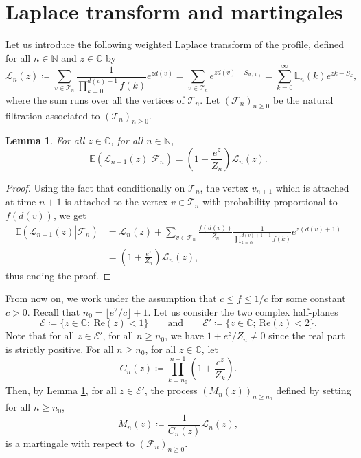 \documentclass[11pt]{article}
\newtheorem{lemma}[theorem]{Lemma}
\numberwithin{equation}{section}
\def \N{\mathbb{N}}
\def \C{\mathbb{C}}
\def \T{\mathcal{T}}
\def \cL{\mathcal{L}}
\def\E{\mathbb{E}}
\renewcommand{\Re}{\mathrm{Re}}
\begin{document}
\section{Laplace transform and martingales}\label{section martingale}
Let us introduce the following weighted Laplace transform of the profile, defined for all $n\in \N$ and $z \in \C$ by
\[
\cL_n(z) \coloneqq \sum_{v \in \T_n} \frac{1}{\prod_{k=0}^{d(v)-1} f(k)} e^{zd(v)}  = \sum_{v \in \T_n} e^{zd(v)-S_{d(v)}} = \sum_{k=0}^{\infty} \mathbb{L}_n(k)e^{zk-S_k},
\]
where the sum runs over all the vertices of $\T_n$. Let $(\mathcal{F}_n)_{n\ge 0}$ be the natural filtration associated to $(\T_n)_{n\ge 0}$.
\begin{lemma}\label{lemme martingale}
	For all $z \in \C$, for all $n \in \N$,
	\[
	\E\left(\left. \cL_{n+1}(z)\right\vert \mathcal{F}_n \right) = \left(1 + \frac{e^z}{Z_n}\right) \cL_n(z).
	\]
\end{lemma}
\begin{proof}
	Using the fact that conditionally on $\T_n$, the vertex $v_{n+1}$ which is attached at time $n+1$ is attached to the vertex $v \in \T_n$ with probability proportional to $f(d(v))$, we get
	\begin{align*}
		\E\left(\left. \cL_{n+1}(z)\right\vert \mathcal{F}_n \right)&=
		\cL_n(z) + \sum_{v \in \T_n} \frac{f(d(v))}{Z_n} \frac{1}{\prod_{k=0}^{d(v)+1-1} f(k)} e^{z (d(v)+1)}
		\\
		&=
		\left(1+ \frac{e^z}{Z_n} \right) \cL_n(z),
	\end{align*}
	thus ending the proof.
\end{proof}
From now on, we work under the assumption that $c\le f\le 1/c$ for some constant $c>0$. Recall that $n_0= \lfloor e^2/c \rfloor +1$. Let us consider the two complex half-planes
\[
\mathcal{E} \coloneqq \{ z \in \C; \ \Re(z) <1\} \qquad \text{and} \qquad
\mathcal{E}' \coloneqq \{ z\in \C; \ \Re(z) < 2\}.
\]
Note that for all $z \in \mathcal{E}'$, for all $n\ge n_0$, we have $1+ e^z/Z_n \neq 0$ since the real part is strictly positive. For all $n\ge n_0$, for all $z\in \C$, let
\[
C_n(z) \coloneqq  \prod_{k=n_0}^{n-1} \left( 1 + \frac{e^z}{Z_k}\right).
\]
Then, by Lemma \ref{lemme martingale}, for all $z\in \mathcal{E}'$, the process $(M_n(z))_{n\ge n_0}$ defined by setting for all $n\ge n_0$,
\[
M_n(z) \coloneqq \frac{1}{C_n(z)} \cL_n(z),
\]
is a martingale with respect to $(\mathcal{F}_n)_{n\ge0}$.
\end{document}
